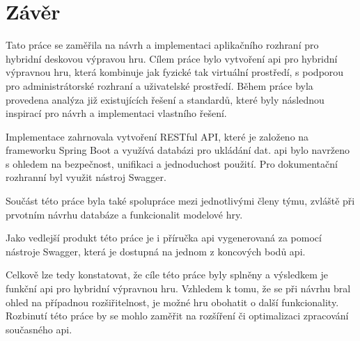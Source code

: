 \chapter{Závěr}
Tato práce se zaměřila na návrh a implementaci aplikačního rozhraní pro hybridní deskovou výpravou hru. Cílem práce bylo vytvoření \gls{api} pro hybridní výpravnou hru, která kombinuje jak fyzické tak virtuální prostředí, s podporou pro administrátorské rozhraní a uživatelské prostředí. Během práce byla provedena analýza již existujících řešení a standardů, které byly následnou inspirací pro návrh a implementaci vlastního řešení.

Implementace zahrnovala vytvoření RESTful API, které je založeno na frameworku Spring Boot a využívá databázi pro ukládání dat. \gls{api} bylo navrženo s ohledem na bezpečnost, unifikaci a jednoduchost použití. Pro dokumentační rozhranní byl využit nástroj Swagger. 

Součást této práce byla také spolupráce mezi jednotlivými členy týmu, zvláště při prvotním návrhu databáze a funkcionalit modelové hry. 

Jako vedlejší produkt této práce je i příručka \gls{api} vygenerovaná za pomocí nástroje Swagger, která je dostupná na jednom z koncových bodů \gls{api}.

Celkově lze tedy konstatovat, že cíle této práce byly splněny a výsledkem je funkční \gls{api} pro hybridní výpravnou hru. Vzhledem k tomu, že se při návrhu bral ohled na případnou rozšiřitelnost, je možné hru obohatit o další funkcionality. Rozbinutí této práce by se mohlo zaměřit na rozšíření či optimalizaci zpracování současného \gls{api}.

\endinput